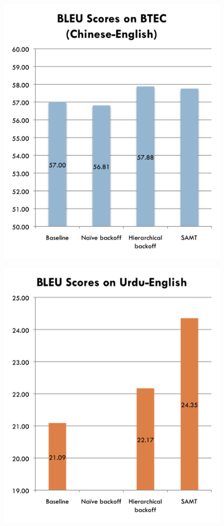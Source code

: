 \begin{figure}
\label{fig:btec}
\includegraphics{btec.png}
\end{figure}

\begin{figure}
\label{fig:urdu}
\includegraphics{urdu.png}
\end{figure}

